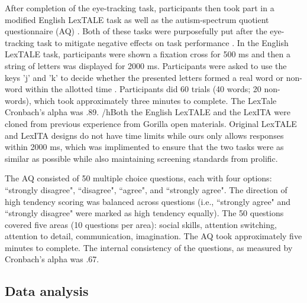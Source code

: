 After completion of the eye-tracking task, participants then took part in a modified English LexTALE \citep{lemhofer2012introducing} task as well as the autism-spectrum quotient questionnaire (AQ) \citep{Baron-Cohen2001}. Both of these tasks were purposefully put after the eye-tracking task to mitigate negative effects on task performance \citep{Chang_2024}. In the English LexTALE task, participants were shown a fixation cross for 500 ms and then a string of letters was displayed for 2000 ms. Participants were asked to use the keys 'j' and 'k' to decide whether the presented letters formed a real word or non-word within the allotted time \cite{lemhofer2012introducing}. Participants did 60 trials (40 words; 20 non-words), which took approximately three minutes to complete. The LexTale Cronbach’s alpha was .89. /h{Both the English LexTALE and the LexITA were cloned from previous experience} from Gorilla open materials. Original LexTALE and LexITA designs do not have time limits while ours only allows responses within 2000 ms, which was implimented to ensure that the two tasks were as similar as possible while also maintaining screening standards from prolific. 

The AQ \citep{Baron-Cohen2001} consisted of 50 multiple choice questions, each with four options: ``strongly disagree", ``disagree", ``agree", and ``strongly agree". The direction of high tendency scoring was balanced across questions (i.e., ``strongly agree" and ``strongly disagree" were marked as high tendency equally). The 50 questions covered five areas (10 questions per area): social skills, attention switching, attention to detail, communication, imagination. The AQ took approximately five minutes to complete. The internal consistency of the questions, as measured by Cronbach’s alpha was .67.


\subsection{Data analysis}

